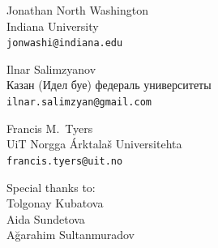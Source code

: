 \documentclass[fontscale=0.3,landscape,paperwidth=72in,paperheight=36in]{baposter}  %
\begin{document}
\begin{poster}
{			\vspace{-0.5em}
			\begin{center}
			{\begin{minipage}[t]{12em}
				\begin{spacing}{0.4}
					{Jonathan North Washington}\\
					{\footnotesize Indiana University\\\texttt{jonwashi@indiana.edu}}
				\end{spacing}
			\end{minipage}
			\begin{minipage}[t]{11em}
				\begin{spacing}{0.4}
					{Ilnar Salimzyanov}\\
					{\footnotesize Казан (Идел буе) федераль университеты \\\texttt{ilnar.salimzyan@gmail.com}}
				\end{spacing}
			\end{minipage}
			\begin{minipage}[t]{9em}
				\begin{spacing}{0.4}
					{Francis M.\ Tyers}\\
					{\footnotesize UiT Norgga Árktalaš Universitehta \\\texttt{francis.tyers@uit.no}}
				\end{spacing}
			\end{minipage}}
			\begin{minipage}[t]{7em}
				\vspace{-0.7em}
				\begin{spacing}{0.4}
					{\footnotesize Special thanks to:}\\
					{\small Tolgonay Kubatova}\\
					{\small Aida Sundetova}\\
					{\small Ağarahim Sultanmuradov}\\
				\end{spacing}
			\end{minipage}
			\end{center}

}
\end{poster}
\end{document}
